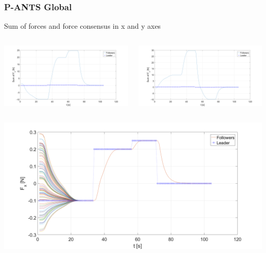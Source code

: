 \documentclass{beamer}
\begin{document}
\begin{frame}
\frametitle{P-ANTS Global}

Sum of forces and force consensus in x and y axes

\begin{columns}[c] 
\centering
 \includegraphics[width=1\textwidth]{figures/P_ANTS_SumFx.png}

\centering
 \includegraphics[width=1\textwidth]{figures/P_ANTS_SumFy.png}
\end{columns}

\begin{columns}[c] 
\centering
 \includegraphics[width=1\textwidth]{figures/P_ANTS_Fx.png}


\end{columns}
\end{frame}
\end{document}
